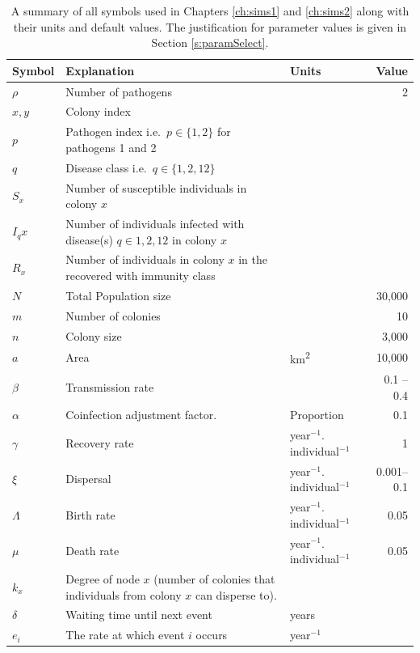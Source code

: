 \begin{table}[b!]
\centering
\caption[All symbols used in Chapters \ref{ch:sims1} and \ref{ch:sims2}.]{A summary of all symbols used in Chapters \ref{ch:sims1} and \ref{ch:sims2} along with their units and default values.
The justification for parameter values is given in Section \ref{s:paramSelect}.}

\begin{tabular}{@{}lp{6cm}p{2.9cm}r@{}}
\toprule
Symbol & Explanation & Units & Value\\
\midrule
$\rho$ & Number of pathogens && 2\\
$x, y$ & Colony index &&\\
$p$ &  Pathogen index i.e.\ $p\in\{1,2\}$ for pathogens 1 and 2 & &\\
$q$ & Disease class i.e.\ $q\in\{1,2,12\}$&\\
$S_x$ & Number of susceptible individuals in colony $x$ &&\\
$I_qx$ & Number of individuals infected with disease(s) $q \in {1, 2, 12}$ in colony $x$ &&\\
$R_x$ & Number of individuals in colony $x$ in the recovered with immunity class  &&\\
$N$ & Total Population size && 30,000\\
$m$ & Number of colonies&& 10\\
$n$ & Colony size && 3,000\\
$a$ & Area & \si{\square\kilo\metre}& 10,000\\
$\beta$ & Transmission rate &  & 0.1 -- 0.4\\
$\alpha$ & Coinfection adjustment factor.  & Proportion & 0.1\\
$\gamma$ & Recovery rate & year$^{-1}.$individual$^{-1}$ & 1\\
$\xi$ & Dispersal & year$^{-1}.$individual$^{-1}$ & 0.001--0.1\\
$\Lambda$ & Birth rate & year$^{-1}.$individual$^{-1}$ & 0.05\\
$\mu$ & Death rate & year$^{-1}.$individual$^{-1}$ & 0.05\\
$k_x$ & Degree of node $x$ (number of colonies that individuals from colony $x$ can disperse to). &&\\
$\delta$ & Waiting time until next event & years &\\

$e_i$ & The rate at which event $i$ occurs & year$^{-1}$&\\
\bottomrule
\end{tabular}

\label{t:params}
\end{table}


